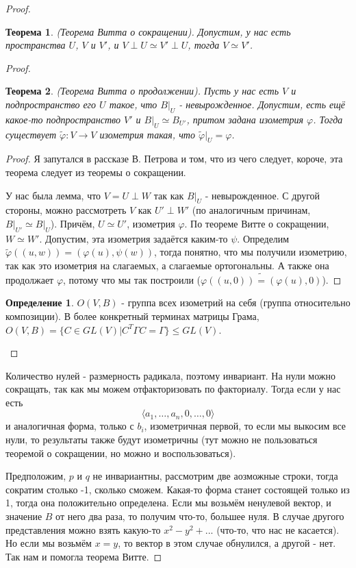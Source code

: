 \documentclass[a4paper,100pt]{article}
\theoremstyle{indented}
\newtheorem{theorem}{Теорема}
\theoremstyle{definition}
\newtheorem{defn}{Определение}
\theoremstyle{remark}
\begin{document}
\begin{proof}

\begin{theorem}
    (Теорема Витта о сокращении). Допустим, у нас есть пространства $U$, $V$ и $V'$, и $V\perp U \simeq V'\perp U$, тогда $V\simeq V'$. 
\end{theorem}

\begin{proof}

    \begin{theorem}
        (Теорема Витта о продолжении). Пусть у нас есть $V$ и подпространство его $U$ такое, что $B\bigg|_U$ - невырожденное. Допустим, есть ещё какое-то подпространство $V'$ и $B\bigg|_U\simeq B_{U'}$, притом задана изометрия $\varphi$. Тогда существует $\tilde{\varphi}:V\rightarrow V$ изометрия такая, что $\tilde{\varphi}|_{U}=\varphi$. 
    \end{theorem}

    \begin{proof}
        Я запутался в рассказе В. Петрова и том, что из чего следует, короче, эта теорема следует из теоремы о сокращении. \ 

        У нас была лемма, что $V=U\perp W$ так как $B\bigg|_U$ - невырожденное. С другой стороны, можно рассмотреть $V$ как $U'\perp W'$ (по аналогичным причинам, $B\bigg|_{U'}\simeq B\bigg|_U$). Причём, $U\simeq U'$, изометрия $\varphi$. По теореме Витте о сокращении, $W\simeq W'$. Допустим, эта изометрия задаётся каким-то $\psi$. Определим $\tilde{\varphi}((u, w))= (\varphi(u), \psi(w))$, тогда понятно, что мы получили изометрию, так как это изометрия на слагаемых, а слагаемые ортогональны. А также она продолжает $\varphi$, потому что мы так построили ($\tilde{\varphi((u, 0))=(\varphi(u), 0)}$).
    \end{proof}

    \begin{defn}
        $O(V, B)$ - группа всех изометрий на себя (группа относительно композиции). В более конкретный терминах матрицы Грама, $O(V, B)=\{C\in GL(V)|C^T\Gamma C=\Gamma\}\leq GL(V)$. 
    \end{defn}

\end{proof}

Количество нулей - размерность радикала, поэтому инвариант. На нули можно сокращать, так как мы можем отфакторизовать по факториалу. Тогда если у нас есть 
\[
\langle a_1, \ldots, a_n, 0, \ldots, 0 \rangle
\]
и аналогичная форма, только с $b_i$, изометричная первой, то если мы выкосим все нули, то результаты также будут изометричны (тут можно не пользоваться теоремой о сокращении, но можно и воспользоваться). \ 

Предположим, $p$ и $q$ не инвариантны, рассмотрим две аозможные строки, тогда сократим столько -1, сколько сможем. Какая-то форма станет состоящей только из 1, тогда она положительно определена. Если мы возьмём ненулевой вектор, и значение $B$ от него два раза, то получим что-то, большее нуля. В случае другого представления можно взять какую-то $x^2-y^2+...$ (что-то, что нас не касается). Но если мы возьмём $x=y$, то вектор в этом случае обнулился, а другой - нет. Так нам и помогла теорема Витте.

\end{proof}
\end{document}
